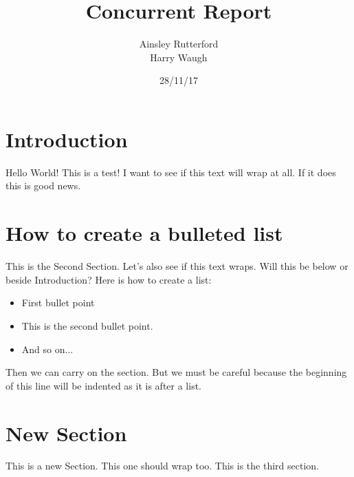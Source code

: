 \documentclass{article}
\begin{document}
\title{\vspace{-2.0cm}Concurrent Report}

\author{Ainsley Rutterford \\ Harry Waugh}

\date{28/11/17}

\maketitle

\begin{multicols}{2}

\section{Introduction}
Hello World! This is a test! I want to see if this text will wrap at all. If it does this is good news.

\section{How to create a bulleted list}
This is the Second Section. Let's also see if this text wraps. Will this be below or beside Introduction? Here is how to create a list:

\begin{itemize}
\item First bullet point
\item This is the second bullet point.
\item And so on...
\end{itemize}

Then we can carry on the section. But we must be careful because the beginning of this line will be indented as it is after a list.

\columnbreak

\section{New Section}
This is a new Section. This one should wrap too. This is the third section.

\end{multicols}

\end{document}
